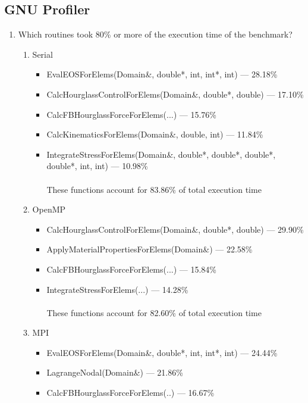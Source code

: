 \documentclass{article}
\begin{document}
\subsection{GNU Profiler} %
\begin{enumerate}
\item Which routines took 80\% or more of the execution time of the benchmark?

\begin{enumerate}
	\item{Serial}
	\begin{itemize}
		\item{EvalEOSForElems(Domain\&, double*, int, int*, int) --- 28.18\%}
		\item{CalcHourglassControlForElems(Domain\&, double*, double) --- 17.10\%}
		\item{CalcFBHourglassForceForElems(...) --- 15.76\%}
		\item{CalcKinematicsForElems(Domain\&, double, int) --- 11.84\%}
		\item{IntegrateStressForElems(Domain\&, double*, double*, double*, double*, int, int) --- 10.98\%}
\\\\These functions account for 83.86\% of total execution time
	\end{itemize}
	\item{OpenMP}
	\begin{itemize}
		\item{CalcHourglassControlForElems(Domain\&, double*, double) --- 29.90\%}
		\item{ApplyMaterialPropertiesForElems(Domain\&) --- 22.58\%}
		\item{CalcFBHourglassForceForElems(...) --- 15.84\%}
		\item{IntegrateStressForElems(...) --- 14.28\% }
\\\\These functions account for 82.60\% of total execution time
	\end{itemize}
	\item{MPI}
	\begin{itemize}
		\item{EvalEOSForElems(Domain\&, double*, int, int*, int) --- 24.44\%}
		\item{LagrangeNodal(Domain\&) --- 21.86\%}
		\item{CalcFBHourglassForceForElems(..) --- 16.67\%}

\end{itemize}
\end{enumerate}
\end{enumerate}
\end{document}
